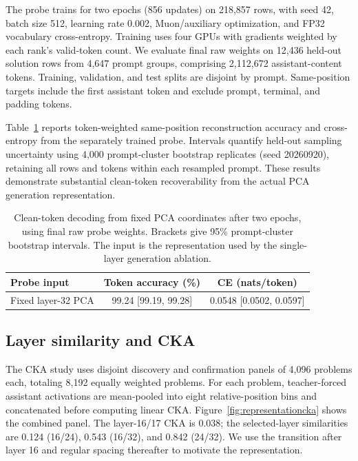 \documentclass[11pt,letterpaper]{article}
\begin{document}
The probe trains for two epochs (856 updates) on 218,857 rows, with seed 42, batch size 512, learning rate 0.002, Muon/auxiliary optimization, and FP32 vocabulary cross-entropy. Training uses four GPUs with gradients weighted by each rank's valid-token count. We evaluate final raw weights on 12,436 held-out solution rows from 4,647 prompt groups, comprising 2,112,672 assistant-content tokens. Training, validation, and test splits are disjoint by prompt. Same-position targets include the first assistant token and exclude prompt, terminal, and padding tokens.

Table~\ref{tab:pcadecoding} reports token-weighted same-position reconstruction accuracy and cross-entropy from the separately trained probe. Intervals quantify held-out sampling uncertainty using 4,000 prompt-cluster bootstrap replicates (seed 20260920), retaining all rows and tokens within each resampled prompt. These results demonstrate substantial clean-token recoverability from the actual PCA generation representation.

\begin{table}[htbp]
\centering\small
\caption{Clean-token decoding from fixed PCA coordinates after two epochs, using final raw probe weights. Brackets give 95\% prompt-cluster bootstrap intervals. The input is the representation used by the single-layer generation ablation.}
\label{tab:pcadecoding}
\begin{tabular}{@{}lcc@{}}
\toprule
Probe input & Token accuracy (\%) & CE (nats/token) \\
\midrule
Fixed layer-32 PCA & 99.24 [99.19, 99.28] & 0.0548 [0.0502, 0.0597] \\
\bottomrule
\end{tabular}
\end{table}

\subsection{Layer similarity and CKA}
\label{app:representationcka}
The CKA study uses disjoint discovery and confirmation panels of 4,096 problems each, totaling 8,192 equally weighted problems. For each problem, teacher-forced assistant activations are mean-pooled into eight relative-position bins and concatenated before computing linear CKA. Figure~\ref{fig:representationcka} shows the combined panel. The layer-16/17 CKA is 0.038; the selected-layer similarities are 0.124 (16/24), 0.543 (16/32), and 0.842 (24/32). We use the transition after layer 16 and regular spacing thereafter to motivate the representation.
\end{document}
